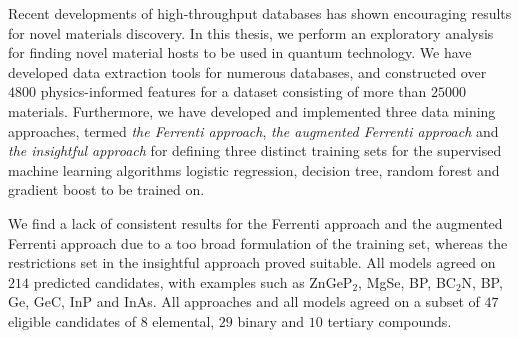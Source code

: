 Recent developments of high-throughput databases has shown encouraging results for novel materials discovery. %
In this thesis,
we perform an exploratory analysis for finding novel material hosts to be used in quantum technology. We have developed data extraction tools for numerous databases, and constructed over $4800$ physics-informed features for a dataset consisting of more than $25000$ materials.
Furthermore, we have developed and implemented three data mining approaches, termed \textit{the Ferrenti approach}, \textit{the augmented Ferrenti approach} and \textit{the insightful approach} for defining three distinct training sets for the supervised machine learning algorithms logistic regression, decision tree, random forest and gradient boost to be trained on.

We find a lack of consistent results for the Ferrenti approach and the augmented Ferrenti approach due to a too broad formulation of the training set, whereas the restrictions set in the insightful approach proved suitable. All models agreed on $214$ predicted candidates, with examples such as ZnGeP$_2$, MgSe, BP, BC$_2$N, BP, Ge, GeC, InP and InAs. All approaches and all models agreed on a subset of $47$ eligible candidates of $8$ elemental, $29$ binary and $10$ tertiary compounds.

